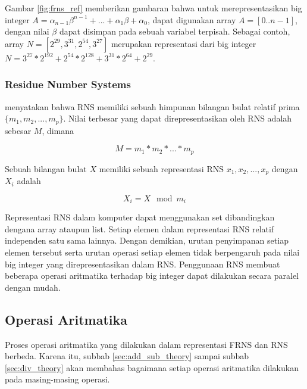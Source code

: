       Gambar \ref{fig:frns_ref} memberikan gambaran bahwa untuk merepresentasikan big integer $A = \alpha_{n-1}\beta^{n-1}+...+\alpha_{1}\beta+\alpha_{0}$, dapat digunakan array $A = [0..n-1]$, dengan nilai $\beta$ dapat disimpan pada sebuah variabel terpisah. Sebagai contoh, array $N = [2^{29}, 3^{31}, 2^{54}, 3^{27}]$ merupakan representasi dari big integer $N = 3^{27}*2^{192} + 2^{54}*2^{128} + 3^{31}*2^{64} + 2^{29}$.

    \subsubsection{Residue Number Systems} \label{sec:rns}
      \citet{rns_survey} menyatakan bahwa RNS memiliki sebuah himpunan bilangan bulat relatif prima $\{m_1,m_2,...,m_p\}$. Nilai terbesar yang dapat direpresentasikan oleh RNS adalah sebesar $M$, dimana

      \begin{equation}
        M = m_1 * m_2 * ... * m_p
      \end{equation}

      Sebuah bilangan bulat $X$ memiliki sebuah representasi RNS ${x_1,x_2,...,x_p}$ dengan $X_i$ adalah

      \begin{equation}
        X_i = X \mod m_i
      \end{equation}


      Representasi RNS dalam komputer dapat menggunakan set dibandingkan dengana array ataupun list. Setiap elemen dalam representasi RNS relatif independen satu sama lainnya. Dengan demikian, urutan penyimpanan setiap elemen tersebut serta urutan operasi setiap elemen tidak berpengaruh pada nilai big integer yang direpresentasikan dalam RNS. Penggunaan RNS membuat beberapa operasi aritmatika terhadap big integer dapat dilakukan secara paralel dengan mudah.


  \subsection{Operasi Aritmatika}

    Proses operasi aritmatika yang dilakukan dalam representasi FRNS dan RNS berbeda. Karena itu, subbab \ref{sec:add_sub_theory} sampai subbab \ref{sec:div_theory} akan membahas bagaimana setiap operasi aritmatika dilakukan pada masing-masing operasi.


